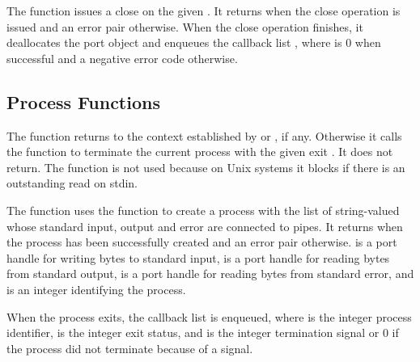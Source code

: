 \begin{function}
\end{function}

The  function issues a close on the given
. It returns  when the close operation is issued
and an error pair otherwise. When the close operation finishes, it
deallocates the port object and enqueues the callback list
, where  is 0 when
successful and a negative error code otherwise.

\subsection {Process Functions}

\begin{function}
\end{function}

The  function returns  to the context
established by  or , if any.
Otherwise it calls the  function to terminate the current
process with the given exit . It does not return. The
 function is not used because on Unix systems it blocks if
there is an outstanding read on stdin.

\begin{function}
\end{function}

The  function uses the  function to
create a process with the list of string-valued  whose
standard input, output and error are connected to pipes.  It returns
 when the process has been successfully created and an
error pair otherwise.   is a port handle for writing
bytes to standard input,  is a port handle for
reading bytes from standard output,  is a port handle
for reading bytes from standard error, and  is an integer
identifying the process.

When the process exits, the callback list  is enqueued, where
 is the integer process identifier,  is the
integer exit status, and  is the integer termination
signal or 0 if the process did not terminate because of a signal.

